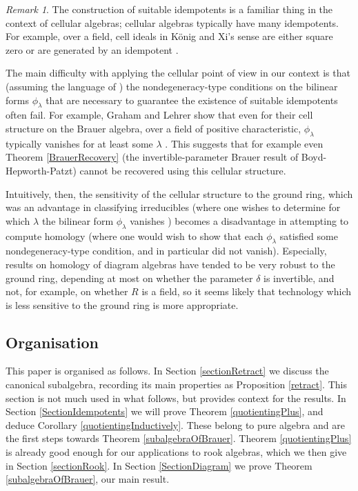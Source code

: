 \documentclass[12pt]{amsart}
\theoremstyle{plain}
\theoremstyle{definition} \newtheorem{definition}[theorem]{Definition}
\theoremstyle{plain}
\theoremstyle{plain} \newtheorem{proposition}[theorem]{Proposition}
\theoremstyle{plain} \newtheorem{conjecture}[theorem]{Conjecture}
\theoremstyle{plain} \newtheorem{corollary}[theorem]{Corollary}
\theoremstyle{remark} \newtheorem{claim}[theorem]{Claim}
\theoremstyle{remark} \newtheorem{remark}[theorem]{Remark}
\theoremstyle{remark} \newtheorem{example}[theorem]{Example}
\theoremstyle{remark} \newtheorem{comment}[theorem]{Comment}
\theoremstyle{definition} \newtheorem{question}[theorem]{Question}
\newcommand{\maxTpt}{canonical}
\begin{document}
\begin{remark} \label{rmk:cellularApplicability} The construction of suitable idempotents is a familiar thing in the context of cellular algebras; cellular algebras typically have many idempotents. For example, over a field, cell ideals in K\"onig and Xi's sense are either square zero or are generated by an idempotent \cite[Proposition 4.1]{KonigXi1}.

The main difficulty with applying the cellular point of view in our context is that (assuming the language of \cite{GrahamLehrer}) the nondegeneracy-type conditions on the bilinear forms $\phi_{\lambda}$ that are necessary to guarantee the existence of suitable idempotents often fail. For example, Graham and Lehrer show that even for their cell structure on the Brauer algebra, over a field of positive characteristic, $\phi_\lambda$ typically vanishes for at least some $\lambda$ \cite[Theorem 4.17]{GrahamLehrer}. This suggests that for example even Theorem \ref{BrauerRecovery} (the invertible-parameter Brauer result of Boyd-Hepworth-Patzt) cannot be recovered using this cellular structure.

Intuitively, then, the sensitivity of the cellular structure to the ground ring, which was an advantage in classifying irreducibles (where one wishes to determine for which $\lambda$ the bilinear form $\phi_{\lambda}$ vanishes \cite[Theorem 3.4]{GrahamLehrer}) becomes a disadvantage in attempting to compute homology (where one would wish to show that each $\phi_{\lambda}$ satisfied some nondegeneracy-type condition, and in particular did not vanish). Especially, results on homology of diagram algebras have tended to be very robust to the ground ring, depending at most on whether the parameter $\delta$ is invertible, and not, for example, on whether $R$ is a field, so it seems likely that technology which is less sensitive to the ground ring is more appropriate.
\end{remark}

\subsection{Organisation} This paper is organised as follows. In Section \ref{sectionRetract} we discuss the {\maxTpt} subalgebra, recording its main properties as Proposition \ref{retract}. This section is not much used in what follows, but provides context for the results. In Section \ref{SectionIdempotents} we will prove Theorem \ref{quotientingPlus}, and deduce Corollary \ref{quotientingInductively}. These belong to pure algebra and are the first steps towards Theorem \ref{subalgebraOfBrauer}. Theorem \ref{quotientingPlus} is already good enough for our applications to rook algebras, which we then give in Section \ref{sectionRook}. In Section \ref{SectionDiagram} we prove Theorem \ref{subalgebraOfBrauer}, our main result.
\end{document}
